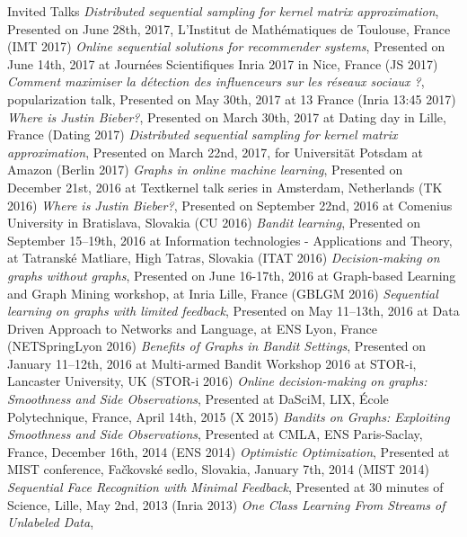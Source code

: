 \documentclass{resume}
\begin{document}
\begin{category}{Invited Talks}
\citembullet
\emph{Distributed sequential sampling for kernel matrix approximation}, Presented on June 28th, 2017, L'Institut de Math\' ematiques de Toulouse, France
({\sf IMT 2017})
\citembullet
\emph{Online sequential solutions for recommender systems}, Presented on June 14th, 2017 at Journ\'ees Scientifiques Inria 2017 in Nice, France  
({\sf JS 2017})
\citembullet
\emph{Comment maximiser la d\'etection des influenceurs sur les r\'eseaux sociaux ?}, popularization talk, Presented on May 30th, 2017  at 13 France 
({\sf Inria 13:45 2017})
\citembullet
\emph{Where is Justin Bieber?}, Presented on March 30th, 2017  at Dating day  in Lille, France 
({\sf Dating 2017})
\citembullet
\emph{Distributed sequential sampling for kernel matrix approximation}, Presented on  March 22nd, 2017, for Universit\" at Potsdam at Amazon 
({\sf Berlin 2017})
\citembullet
\emph{Graphs in online machine learning}, Presented on December 21st, 2016 at Textkernel talk series in Amsterdam, Netherlands 
({\sf TK 2016})
\citembullet
\emph{Where is Justin Bieber?}, Presented on September 22nd, 2016 at Comenius University in Bratislava, Slovakia 
({\sf CU 2016})
\citembullet
\emph{Bandit learning}, Presented on September 15--19th, 2016 at Information technologies - Applications and Theory, at Tatransk\' e Matliare, High Tatras, Slovakia
({\sf ITAT 2016})
\citembullet
\emph{Decision-making on graphs without graphs}, Presented on June 16-17th, 2016 at Graph-based Learning and Graph Mining workshop, at Inria Lille, France
({\sf GBLGM 2016})
\citembullet
\emph{Sequential learning on graphs with limited feedback}, Presented on May 11--13th, 2016 at Data Driven Approach to Networks and Language, at ENS Lyon, France
({\sf NETSpringLyon 2016})
\citembullet
\emph{Benefits of Graphs in Bandit Settings}, Presented on January 11--12th, 2016 at Multi-armed Bandit Workshop 2016 at STOR-i, Lancaster University, UK 
({\sf STOR-i 2016})
\citembullet
\emph{Online decision-making on graphs: Smoothness and Side Observations},
 Presented  at DaSciM, LIX, \'Ecole Polytechnique, France, April 14th, 2015 
({\sf X 2015})
\citembullet
\emph{Bandits on Graphs: Exploiting Smoothness and Side Observations},
 Presented  at CMLA, ENS Paris-Saclay, France, December 16th, 2014 
({\sf ENS 2014})
\citembullet
  \emph{Optimistic Optimization},
 Presented  at MIST conference, Fa\v ckovsk\' e sedlo, Slovakia, January 7th, 2014
({\sf MIST 2014})
\citembullet
\emph{Sequential Face Recognition with Minimal Feedback},
Presented at 30 minutes of Science, Lille, May 2nd, 2013 ({\sf Inria 2013})
\citembullet
 \emph{One Class Learning From Streams of Unlabeled Data},

\end{category}
\end{document}
